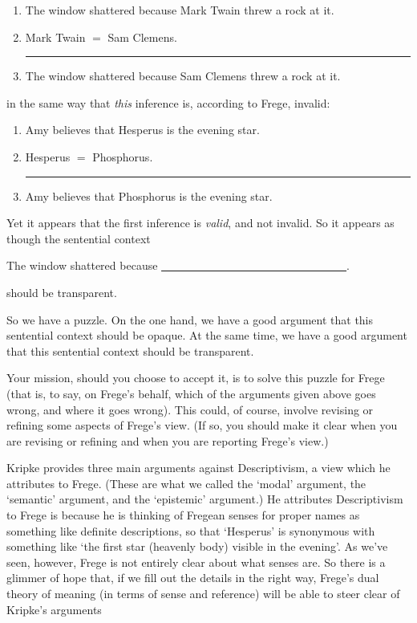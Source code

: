 \documentclass[12pt]{article}
\newcommand{\qee}{\begin{enumerate}[align=left,style=nextline,leftmargin=17pt,labelsep=5pt,font=\normalfont, topsep=10pt]}
\newcommand{\p}{\item}
\newcommand{\e}{\emph}
\newcommand{\thus}{

\vspace{5pt}\hrule

}
\begin{document}
			\begin{center}
			\begin{minipage}{320pt}
			\qee
			\p[P1)] The window shattered because Mark Twain threw a rock at it.
			\p[P2)] Mark Twain $=$ Sam Clemens.	
				\thus
			\p[C)] The window shattered because Sam Clemens threw a rock at it.
			\end{enumerate}
			\end{minipage}
			\end{center}
			
in the same way that \e{this} inference is, according to Frege, invalid:

			\begin{center}
			\begin{minipage}{250pt}
			\qee
			\p[P1)] Amy believes that Hesperus is the evening star.
			\p[P2)] Hesperus $=$ Phosphorus.	
				\thus
			\p[C)] Amy believes that Phosphorus is the evening star.
			\end{enumerate}
			\end{minipage}
			\end{center}
			
Yet it appears that the first inference is \e{valid}, and not invalid.  So it appears as though the sentential context 
		\begin{center}
		The window shattered because \underline{~~~~~~~~~~~~~~~~~~~~~~~~~~~~~~~~~}.
		\end{center}
should be transparent.

So we have a puzzle.  On the one hand, we have a good argument that this sentential context should be opaque.  At the same time, we have a good argument that this sentential context should be transparent.

	Your mission, should you choose to accept it, is to solve this puzzle for Frege (that is, to say, on Frege's behalf, which of the arguments given above goes wrong, and where it goes wrong).  This could, of course, involve revising or refining some aspects of Frege's view.  (If so, you should make it clear when you are revising or refining and when you are reporting Frege's view.)
	
	\p Kripke provides three main arguments against Descriptivism, a view which he attributes to Frege.  (These are what we called the `modal' argument, the `semantic' argument, and the `epistemic' argument.)  He attributes Descriptivism to Frege is because he is thinking of Fregean senses for proper names as something like definite descriptions, so that `Hesperus' is synonymous with something like `the first star (heavenly body) visible in the evening'.  As we've seen, however, Frege is not entirely clear about what senses are.  So there is a glimmer of hope that, if we fill out the details in the right way, Frege's dual theory of meaning (in terms of sense and reference) will be able to steer clear of Kripke's arguments
	
\end{document}
